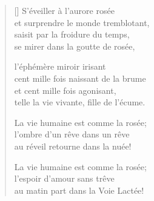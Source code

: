 \documentclass[11pt,a4paper]{article}
\begin{document}
\thispagestyle{empty}


\settowidth{\versewidth}{telle la vie vivante, fille de l'écume.}

\bigskip

\begin{verse}[\versewidth]
S'éveiller à l'aurore rosée\\
et surprendre le monde tremblotant,\\
saisit par la froidure du temps,\\
se mirer dans la goutte de rosée,

l'éphémère miroir irisant\\
cent mille fois naissant de la brume\\
et cent mille fois agonisant,\\
telle la vie vivante, fille de l'écume.

La vie humaine est comme la rosée;\\
l'ombre d'un rêve dans un rêve\\
au réveil retourne dans la nuée!

La vie humaine est comme la rosée;\\
l'espoir d'amour sans trêve\\
au matin part dans la Voie Lactée!
\end{verse}
\end{document}
